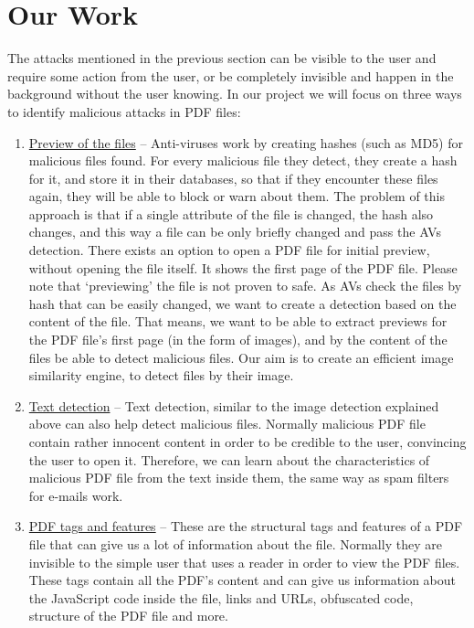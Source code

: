 \documentclass{article}
\begin{document}
\section{Our Work}
\indent The attacks mentioned in the previous section can be visible to the user and require some action from the user, or be completely invisible and happen in the background without the user knowing. In our project we will focus on three ways to identify malicious attacks in PDF files:

\begin{enumerate}
	\item \underline{Preview of the files} – Anti-viruses work by creating hashes (such as MD5) for malicious files found. For every malicious file they detect, they create a hash for it, and store it in their databases, so that if they encounter these files again, they will be able to block or warn about them. The problem of this approach is that if a single attribute of the file is changed, the hash also changes, and this way a file can be only briefly changed and pass the AVs detection. There exists an option to open a PDF file for initial preview, without opening the file itself. It shows the first page of the PDF file. Please note that ‘previewing’ the file is not proven to safe.\newline
	As AVs check the files by hash that can be easily changed, we want to create a detection based on the content of the file. That means, we want to be able to extract previews for the PDF file’s first page (in the form of images), and by the content of the files be able to detect malicious files. Our aim is to create an efficient image similarity engine, to detect files by their image.
	\item \underline{Text detection} – Text detection, similar to the image detection explained above can also help detect malicious files. Normally malicious PDF file contain rather innocent content in order to be credible to the user, convincing the user to open it. Therefore, we can learn about the characteristics of malicious PDF file from the text inside them, the same way as spam filters for e-mails work.
	\item \underline{PDF tags and features} – These are the structural tags and features of a PDF file that can give us a lot of information about the file. Normally they are invisible to the simple user that uses a reader in order to view the PDF files. These tags contain all the PDF's content and can give us information about the JavaScript code inside the file, links and URLs, obfuscated code, structure of the PDF file and more.
\end{enumerate}
\end{document}
